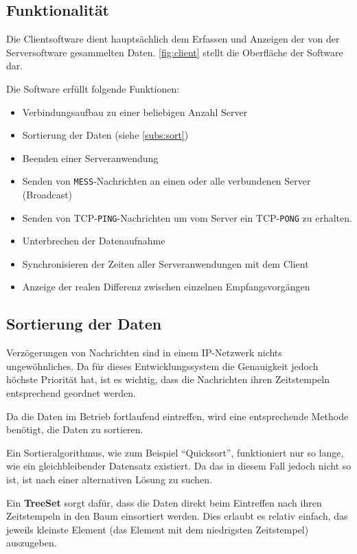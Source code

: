 \subsection{Funktionalität}
Die Clientsoftware dient hauptsächlich dem Erfassen und Anzeigen der von der
Serversoftware gesammelten Daten. \autoref{fig:client} stellt die Oberfläche der
Software dar.

Die Software erfüllt folgende Funktionen:
\begin{itemize}
  \item Verbindungsaufbau zu einer beliebigen Anzahl Server
  \item Sortierung der Daten (siehe \autoref{subs:sort})
  \item Beenden einer Serveranwendung
  \item Senden von \texttt{MESS}-Nachrichten an einen oder alle
  verbundenen Server (Broadcast)
  \item Senden von TCP-\texttt{PING}-Nachrichten um vom Server ein
  TCP-\texttt{PONG} zu erhalten.
  \item Unterbrechen der Datenaufnahme
  \item Synchronisieren der Zeiten aller Serveranwendungen mit dem Client
  \item Anzeige der realen Differenz zwischen einzelnen Empfangsvorgängen
\end{itemize}
\subsection{Sortierung der Daten}\label{subs:sort}
Verzögerungen von Nachrichten sind in einem IP-Netzwerk nichts ungewöhnliches.
Da für dieses Entwicklungssystem die Genauigkeit jedoch höchste Priorität hat,
ist es wichtig, dass die Nachrichten ihren Zeitstempeln entsprechend geordnet
werden.

Da die Daten im Betrieb fortlaufend eintreffen, wird eine entsprechende Methode
benötigt, die Daten zu sortieren.

Ein Sortieralgorithmus, wie zum Beispiel "`Quicksort"', funktioniert nur so
lange, wie ein gleichbleibender Datensatz existiert. Da das in diesem Fall jedoch
nicht so ist, ist nach einer alternativen Lösung zu suchen.

Ein \textbf{TreeSet} sorgt dafür, dass die Daten direkt beim Eintreffen nach
ihren Zeitstempeln in den Baum einsortiert werden. Dies erlaubt es relativ
einfach, das jeweils kleinste Element (das Element mit dem niedrigsten
Zeitstempel) auszugeben. 

